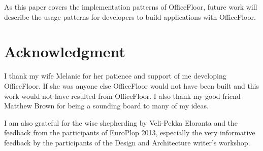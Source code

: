 \documentclass[prodmode]{style/acmlarge}
\begin{document}
As this paper covers the implementation patterns of OfficeFloor, future work
will describe the usage patterns for developers to build applications with
OfficeFloor.



\section*{Acknowledgment} 

I thank my wife Melanie for her patience and support of me developing
OfficeFloor.  If she was anyone else OfficeFloor would not have been built and
this work would not have resulted from OfficeFloor.  I also thank my good friend
Matthew Brown for being a sounding board to many of my ideas.

I am also grateful for the wise shepherding by Veli-Pekka Eloranta and the
feedback from the participants of EuroPlop 2013, especially the very informative
feedback by the participants of the Design and Architecture writer's workshop.




\end{document}
